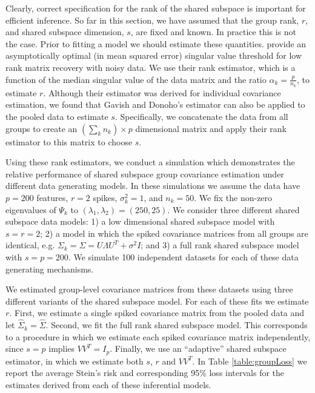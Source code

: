 \documentclass[12pt]{article}
\begin{document}
Clearly, correct specification for the rank of the shared subspace is
important for efficient inference.  So far in this section, we have
assumed that the group rank, $r$, and shared subspace dimension, $s$,
are fixed and known.  In practice this is not the case.  Prior to
fitting a model we should estimate these quantities.
\citet{Gavish2014} provide an asymptotically optimal (in mean squared
error) singular value threshold for low rank matrix recovery with
noisy data.  We use their rank estimator, which is a function of the
median singular value of the data matrix and the ratio
$\alpha_k =\frac{p}{n_k}$, to estimate $r$.  Although their estimator
was derived for individual covariance estimation, we found that Gavish
and Donoho's estimator can also be applied to the pooled data to
estimate $s$.  Specifically, we concatenate the data from all groups
to create an $(\sum_k n_k) \times p$ dimensional matrix and apply
their rank estimator to this matrix to choose $s$.

Using these rank estimators, we conduct a simulation which
demonstrates the relative performance of shared subspace group
covariance estimation under different data generating models.  In
these simulations we assume the data have $p=200$ features, $r=2$
spikes, $\sigma^2_k=1$, and $n_k = 50$.  We fix the non-zero eigenvalues of
$\Psi_k$ to $(\lambda_1, \lambda_2) = (250, 25)$.  We consider three
different shared subspace data models: 1) a low dimensional shared
subspace model with $s=r=2$; 2) a model in which the spiked covariance
matrices from all groups are identical, e.g.
$\Sigma_k = \Sigma = U\Lambda U^T + \sigma^2I$; and 3) a full rank
shared subspace model with $s=p=200$.  We simulate 100 independent
datasets for each of these data generating mechanisms.

We estimated group-level covariance matrices from these datasets using three different variants of the shared
subspace model.  For each of these fits we estimate $r$.  First, we
estimate a single spiked covariance matrix from the pooled data and
let $\hat{\Sigma}_k = \hat{\Sigma}$.  Second, we fit the full rank
shared subspace model.  This corresponds to a procedure in which we
estimate each spiked covariance matrix independently, since $s=p$
implies $VV^T = I_p$.  Finally, we use an ``adaptive'' shared subspace
estimator, in which we estimate both $s$, $r$ and $VV^T$.  In Table
\ref{table:groupLoss} we report the average Stein's risk and
corresponding 95\% loss intervals for the estimates derived from each
of these inferential models.
\end{document}

